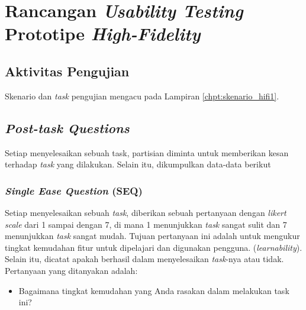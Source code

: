 \chapter{Rancangan \textit{Usability Testing} Prototipe \textit{High-Fidelity}}
\label{chpt:testing_hifi}

\newlength{\coln}
\setlength{\coln}{0.02\textwidth}

\newcommand{\apghead}[1]{\cellcolor[HTML]{A3E5F5}\textbf{#1}}
\newcommand{\apgheadcell}[1]{\multicolumn{1}{c|}{\apghead{#1}}}

\newcommand{\borderblue}{\arrayrulecolor[HTML]{A3E5F5}}
\newcommand{\borderblack}{\arrayrulecolor{black}}


\large \section{Aktivitas Pengujian}
\normalsize
Skenario dan \textit{task} pengujian mengacu pada Lampiran \ref{chpt:skenario_hifi1}.

\large \section{\textit{Post-task Questions}}
\normalsize

Setiap menyelesaikan sebuah task, partisian diminta untuk memberikan kesan terhadap \textit{task} yang dilakukan. Selain itu, dikumpulkan data-data berikut

\subsection{\textit{Single Ease Question} (SEQ)}

Setiap menyelesaikan sebuah \textit{task}, diberikan sebuah pertanyaan dengan \textit{likert scale} dari 1 sampai dengan 7, di mana 1 menunjukkan \textit{task} sangat sulit dan 7 menunjukkan \textit{task} sangat mudah. Tujuan pertanyaan ini adalah untuk mengukur tingkat kemudahan fitur untuk dipelajari dan digunakan pengguna. (\textit{learnability}). Selain itu, dicatat apakah berhasil dalam menyelesaikan \textit{task}-nya atau tidak. Pertanyaan yang ditanyakan adalah:

\begin{itemize}
  \item Bagaimana tingkat kemudahan yang Anda rasakan dalam melakukan task ini?
\end{itemize}




